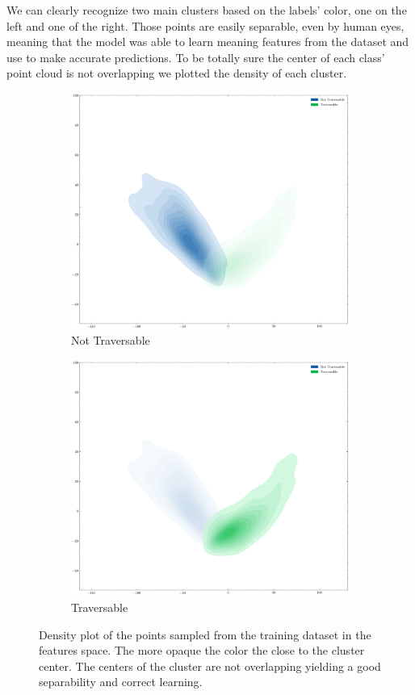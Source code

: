 \documentclass[../document.tex]{subfiles}
\begin{document}
We can clearly recognize two main clusters based on the labels' color, one on the left and one of the right. Those points are easily separable, even by human eyes, meaning that the model was able to learn meaning features from the dataset and use to make accurate predictions. To be totally sure the center of each class' point cloud is not overlapping we plotted the density of each cluster.
\begin{figure} [htbp]
    \begin{subfigure}[b]{0.48\textwidth}
        \includegraphics[width=\linewidth]{../img/5/pca/pca-0-density.png}
        \caption{Not Traversable}
    \end{subfigure}
    \begin{subfigure}[b]{0.48\textwidth}
        \includegraphics[width=\linewidth]{../img/5/pca/pca-1-density.png}
        \caption{Traversable}
    \end{subfigure}
    \caption{Density plot of the points sampled from the training dataset in the features space. The more opaque the color the close to the cluster center. The centers of the cluster are not overlapping yielding a good separability and correct learning.}
    \end{figure}
\end{document}
